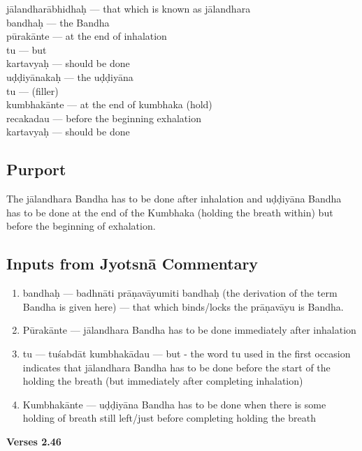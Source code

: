 \begin{multicols}{2}
jālandharābhidhaḥ --- that which is known as jālandhara\\
bandhaḥ --- the Bandha \\
pūrakānte --- at the end of inhalation \\
tu --- but  \\
kartavyaḥ ---  should be done \\
uḍḍiyānakaḥ --- the uḍḍiyāna\\
tu --- (filler)\\
kumbhakānte ---  at the end of kumbhaka (hold)\\
recakadau ---  before the beginning exhalation\\
kartavyaḥ --- should be done 
\end{multicols}

\subsection*{Purport}

The jālandhara Bandha has to be done after inhalation and uḍḍiyāna Bandha has to be done at the end of the Kumbhaka (holding the breath within) but before the beginning of exhalation. 

\subsection*{Inputs from Jyotsnā Commentary}

\begin{enumerate}
\item bandhaḥ --- badhnāti prāṇavāyumiti bandhaḥ (the derivation of the term Bandha is given here) --- that which binds/locks the prāṇavāyu is Bandha.
\item Pūrakānte --- jālandhara Bandha has to be done immediately after inhalation 
\item tu --- tuśabdāt kumbhakādau --- but - the word tu used in the first occasion indicates that  jālandhara Bandha has to be done before the start of the holding the breath (but immediately after completing inhalation)
\item Kumbhakānte --- uḍḍiyāna Bandha has to be done when there is some holding of breath still left/just before completing holding the breath
\end{enumerate}
\newpage


\noindent \textbf{Verses 2.46}

